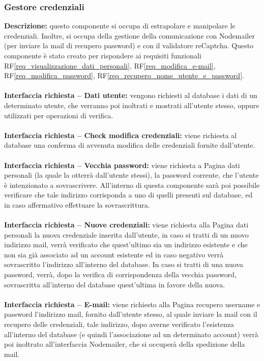 \subsubsection{Gestore credenziali}
\textbf{Descrizione:} questo componente si occupa di estrapolare e manipolare le credenziali. Inoltre, si occupa della gestione della comunicazione con Nodemailer (per inviare la mail di recupero password) e con il validatore reCaptcha. Questo componente è stato creato per rispondere ai requisiti funzionali RF\ref{req_visualizzazione_dati_personali}, RF\ref{req_modifica_e-mail}, RF\ref{req_modifica_password}, RF\ref{req_recupero_nome_utente_e_password}.\\
\\
\textbf{Interfaccia richiesta – Dati utente:} vengono richiesti al database i dati di un determinato utente, che verranno poi inoltrati e mostrati all’utente stesso, oppure utilizzati per operazioni di verifica. \\
\\
\textbf{Interfaccia richiesta – Check modifica credenziali:} viene richiesta al database una conferma di avvenuta modifica delle credenziali fornite dall’utente. \\
\\
\textbf{Interfaccia richiesta – Vecchia password:} viene richiesta a Pagina dati personali (la quale la otterrà dall’utente stessi), la password corrente, che l’utente è intenzionato a sovrascrivere. All’interno di questa componente sarà poi possibile verificare che tale indirizzo corrisponda a uno di quelli presenti sul database, ed in caso affermativo effettuare la sovrascrittura. \\
\\
\textbf{Interfaccia richiesta – Nuove credenziali:} viene richiesta alla Pagina dati personali la nuova credenziale inserita dall’utente, in caso si tratti di un nuovo indirizzo mail, verrà verificato che quest’ultimo sia un indirizzo esistente e che non sia già associato ad un account esistente ed in caso negativo verrà sovrascritto l’indirizzo all’interno del database. In caso si tratti di una nuova password, verrà, dopo la verifica di corrispondenza della vecchia password, sovrascritta all’interno del database quest’ultima in favore della nuova. \\
\\
\textbf{Interfaccia richiesta – E-mail:} viene richiesto alla Pagina recupero username e password l’indirizzo mail, fornito dall’utente stesso, al quale inviare la mail con il recupero delle credenziali, tale indirizzo, dopo averne verificato l’esistenza all’interno del database (e quindi l’associazione ad un determinato account) verrà poi inoltrato all’interfaccia Nodemailer, che si occuperà della spedizione della mail. \\
